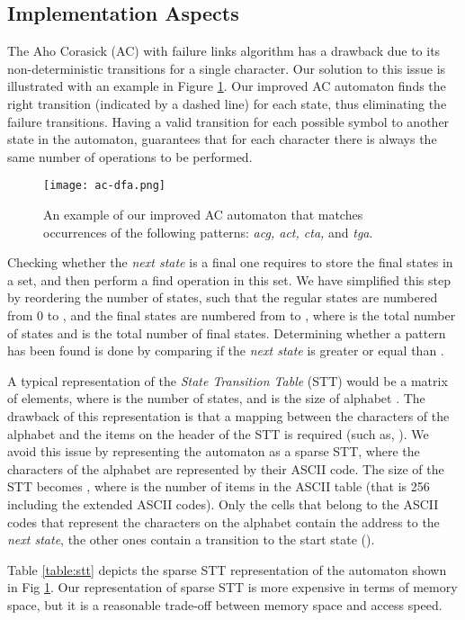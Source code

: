 \documentclass[conference]{IEEEtran}
\begin{document}
\subsection {Implementation Aspects}
\label{sec:impl}

The Aho Corasick (AC) with failure links algorithm has a drawback due to its non-deterministic transitions for a single character. Our solution to this issue is illustrated with an example in Figure \ref{fig:ac-dfa}. Our improved AC automaton finds the right transition (indicated by a dashed line) for each state, thus eliminating the failure transitions. Having a valid transition for each possible symbol to another state in the automaton, guarantees that for each character there is always the same number of operations to be performed.

\begin{figure}[!ht]
	\centering
	\texttt{[image: ac-dfa.png]}
	\caption{An example of our improved AC automaton that matches occurrences of the following patterns: \emph{acg, act, cta,} and \emph{tga}.}
	\label{fig:ac-dfa}
\end{figure}


Checking whether the \emph{next state} is a final one requires to store the final states in a set, and then perform a find operation in this set. We have simplified this step by reordering the number of states, such that the regular states are numbered from 0 to , and the final states are numbered from  to , where  is the total number of states and  is the total number of final states. Determining whether a pattern has been found is done by comparing if the \emph{next state} is greater or equal than .

A typical representation of the \emph{State Transition Table} (STT) would be a matrix of  elements, where  is the number of states, and  is the size of alphabet . The drawback of this representation is that a mapping between the characters of the alphabet and the items on the header of the STT is required (such as, ). We avoid this issue by representing the automaton as a sparse STT, where the characters of the alphabet are represented by their ASCII code. The size of the STT becomes , where  is the number of items in the ASCII table (that is 256 including the extended ASCII codes). Only the cells that belong to the ASCII codes that represent the characters on the alphabet contain the address to the \emph{next state}, the other ones contain a transition to the start state (). 

Table \ref{table:stt} depicts the sparse STT representation of the automaton shown in Fig \ref{fig:ac-dfa}. Our representation of sparse STT is more expensive in terms of memory space, but it is a reasonable trade-off between memory space and access speed. 
\end{document}
